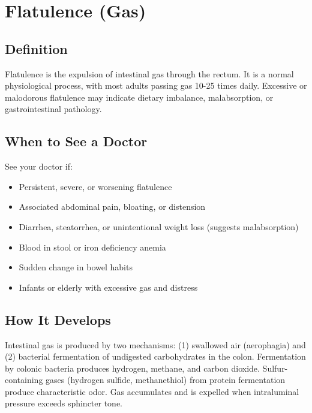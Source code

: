 \chapter{Flatulence (Gas)}

\section*{Definition}
Flatulence is the expulsion of intestinal gas through the rectum. It is a normal physiological process, with most adults passing gas 10-25 times daily. Excessive or malodorous flatulence may indicate dietary imbalance, malabsorption, or gastrointestinal pathology.

\section*{When to See a Doctor}
See your doctor if:
\begin{itemize}
  \item Persistent, severe, or worsening flatulence
  \item Associated abdominal pain, bloating, or distension
  \item Diarrhea, steatorrhea, or unintentional weight loss (suggests malabsorption)
  \item Blood in stool or iron deficiency anemia
  \item Sudden change in bowel habits
  \item Infants or elderly with excessive gas and distress
\end{itemize}

\section*{How It Develops}
Intestinal gas is produced by two mechanisms: (1) swallowed air (aerophagia) and (2) bacterial fermentation of undigested carbohydrates in the colon. Fermentation by colonic bacteria produces hydrogen, methane, and carbon dioxide. Sulfur-containing gases (hydrogen sulfide, methanethiol) from protein fermentation produce characteristic odor. Gas accumulates and is expelled when intraluminal pressure exceeds sphincter tone.

